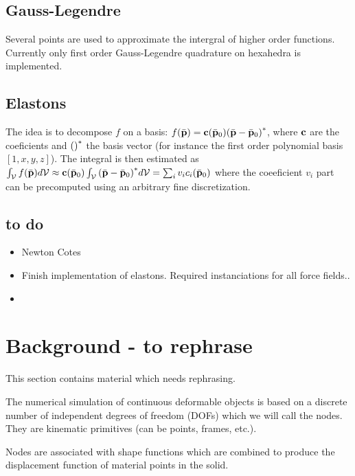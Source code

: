 \subsection{Gauss-Legendre}

Several points are used to approximate the intergral of higher order functions.
Currently only first order Gauss-Legendre quadrature on hexahedra is implemented.

\subsection{Elastons}

The idea is to decompose $f$ on a basis: $f(\bar{\mathbf{{p}}})=\mathbf{{c}}(\bar{\mathbf{{p}}}_0) {(\bar{\mathbf{{p}}}-\bar{\mathbf{{p}}}_0)}^{*}$, 
where $\mathbf{{c}}$ are the coeficients and ${()}^{*}$ the basis vector (for instance the first order polynomial basis $[1,x,y,z]$).
The integral is then estimated as  $\int_{\mathcal{V}} f(\bar{\mathbf{{p}}}) d\mathcal{V} \approx \mathbf{{c}}(\bar{\mathbf{{p}}}_0)  \int_{\mathcal{V}} {(\bar{\mathbf{{p}}}-\bar{\mathbf{{p}}}_0)}^{*} d\mathcal{V} = \sum_i v_i c_i(\bar{\mathbf{{p}}}_0) $
where the coeeficient $v_i$ part can be precomputed using an arbitrary fine discretization.

\subsection{to do}

\begin{itemize}
 \item Newton Cotes
 \item Finish implementation of elastons. Required instanciations for all force fields..
 \item 
\end{itemize}

\appendix

\section{Background - to rephrase}
This section contains material which needs rephrasing.

The numerical simulation of continuous deformable objects is based on a discrete number of independent degrees of freedom (DOFs) which we will call the nodes. They are kinematic primitives (can be points, frames, etc.).

Nodes are associated with shape functions which are combined to produce the displacement function of material points in the solid.

